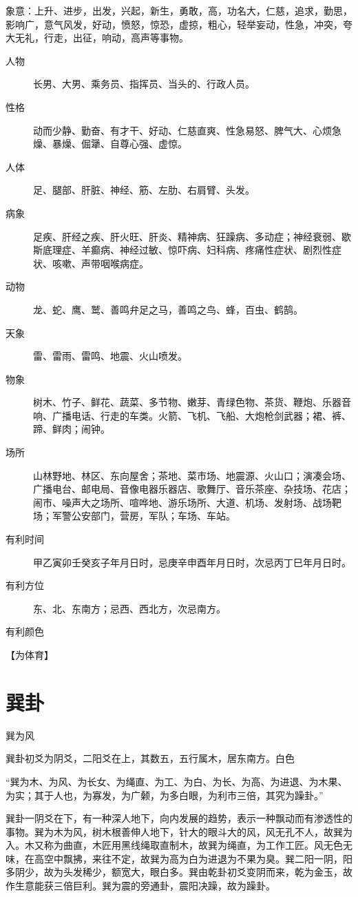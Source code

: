 \documentclass[12pt,oneside]{book}
\begin{document}
象意：上升、进步，出发，兴起，新生，勇敢，高，功名大，仁慈，追求，勤思，影响广，意气风发，好动，愤怒，惊恐，虚掠，粗心，轻举妄动，性急，冲突，夸大无礼，行走，出征，响动，高声等事物。

\begin{description}
\item[人物] 长男、大男、乘务员、指挥员、当头的、行政人员。
\item[性格] 动而少静、勤奋、有才干、好动、仁慈直爽、性急易怒、脾气大、心烦急燥、暴燥、倔犟、自尊心强、虚惊。
\item[人体] 足、腿部、肝脏、神经、筋、左肋、右肩臂、头发。
\item[病象] 足疾、肝经之疾、肝火旺、肝炎、精神病、狂躁病、多动症；神经衰弱、歇斯底理症、羊癫病、神经过敏、惊吓病、妇科病、疼痛性症状、剧烈性症状、咳嗽、声带咽喉病症。
\item[动物] 龙、蛇、鹰、鹫、善鸣弁足之马，善鸣之鸟、蜂，百虫、鹤鹄。
\item[天象] 雷、雷雨、雷鸣、地震、火山喷发。
\item[物象] 树木、竹子、鲜花、蔬菜、多节物、嫩芽、青绿色物、茶货、鞭炮、乐器音响、广播电话、行走的车类。火箭、飞机、飞船、大炮枪剑武器；裙、裤、蹄、鲜肉；闹钟。
\item[场所] 山林野地、林区、东向屋舍；茶地、菜市场、地震源、火山口；演凑会场、广播电台、邮电局、音像电器乐器店、歌舞厅、音乐茶座、杂技场、花店；闹市、噪声大之场所、喧哗地、游乐场所、大道、机场、发射场、战场靶场；军警公安部门，营房，军队；车场、车站。
\item[有利时间] 甲乙寅卯壬癸亥子年月日时，忌庚辛申酉年月日时，次忌丙丁巳年月日时。
\item[有利方位] 东、北、东南方；忌西、西北方，次忌南方。
\item[有利颜色] 
\end{description}



【为体育】



\section{巽卦}
巽为风

巽卦初爻为阴爻，二阳爻在上，其数五，五行属木，居东南方。白色

“巽为木、为风、为长女、为绳直、为工、为白、为长、为高、为进退、为木果、为实；其于人也，为寡发，为广颡，为多白眼，为利市三倍，其究为躁卦。”

巽卦一阴爻在下，有一种深人地下，向内发展的趋势，表示一种飘动而有渗透性的事物。巽为木为风，树木根善伸人地下，针大的眼斗大的风，风无孔不人，故巽为入。木又称为曲直，木匠用黑线绳取直制木，故巽为绳直，为工作工匠。风无色无味，在高空中飘拂，来往不定，故巽为高为白为进退为不果为臭。巽二阳一阴，阳多阴少，故为头发稀少，额宽大，眼白多。巽由乾卦初爻变阴而来，乾为金玉，故作生意能获三倍巨利。巽为震的旁通卦，震阳决躁，故为躁卦。
\end{document}
